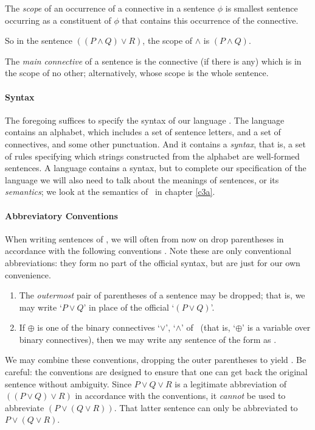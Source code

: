 \begin{definition}[Scope]
		The \emph{scope} of an occurrence of a connective in a sentence $\phi$ is smallest sentence occurring as a constituent of $\phi$ that contains this occurrence of the connective.
\end{definition}
So in the sentence $((P\wedge Q) \vee R)$, the scope of $\wedge$ is $(P \wedge Q)$. 

\begin{definition}
	The \emph{main connective} of a sentence is the connective (if there is any) which is in the scope of no other; alternatively, whose scope is the whole sentence.
\end{definition}



\paragraph{Syntax} The foregoing suffices to specify the syntax of our language \lone. The language contains an alphabet, which includes a set of sentence letters, and a set of connectives, and some other punctuation. And it contains a \emph{syntax}, that is, a set of rules specifying which strings constructed from the alphabet are well-formed sentences. A language contains a syntax, but to complete our specification of the language we will also need to talk about the meanings of sentences, or its \emph{semantics}; we look at the semantics of \lone\ in chapter \ref{c3a}.

\paragraph{Abbreviatory Conventions} When writing sentences of \lone, we will often from now on drop parentheses in accordance with the following conventions \citep[\S2.3]{hallogma}. Note these are only conventional abbreviations: they form no part of the official syntax, but are just for our own convenience. \begin{enumerate}
	\item The \emph{outermost} pair of parentheses of a sentence may be dropped; that is, we may write `$P \vee Q$' in place of the official `$(P \vee Q)$'.
	\item If $\oplus$ is one of the binary connectives `$\vee$', `$\wedge$' of \lone\ (that is, `$\oplus$' is a variable over binary connectives), then we may write any sentence of the form \cquote{((\phi \oplus \psi)\oplus \chi)} as \cquote{(\phi\oplus\psi\oplus\chi)}.
\end{enumerate}
We may combine these conventions, dropping the outer parentheses to yield \cquote{\phi\oplus\psi\oplus\chi}. Be careful: the conventions are designed to ensure that one can get back the original sentence without ambiguity. Since $P \vee Q \vee R$ is a legitimate abbreviation of $((P \vee Q) \vee R)$ in accordance with the conventions, it \emph{cannot} be used to abbreviate $(P \vee (Q \vee R))$. That latter sentence can only be abbreviated to $P \vee (Q \vee R)$. 



